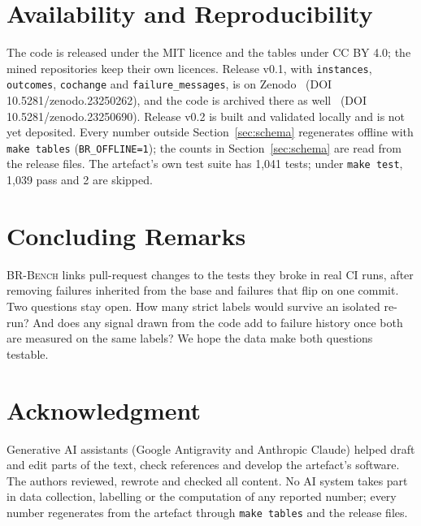 \documentclass[10pt,conference]{IEEEtran}
\begin{document}
\section{Availability and Reproducibility}

The code is released under the MIT licence and the tables under CC BY 4.0; the mined repositories keep their own licences. Release v0.1, with \texttt{instances}, \texttt{outcomes}, \texttt{cochange} and \texttt{failure\_messages}, is on Zenodo~\cite{brbench_data} (DOI 10.5281/zenodo.23250262), and the code is archived there as well~\cite{brbench_code} (DOI 10.5281/zenodo.23250690). Release v0.2 is built and validated locally and is not yet deposited. Every number outside Section~\ref{sec:schema} regenerates offline with \texttt{make tables} (\texttt{BR\_OFFLINE=1}); the counts in Section~\ref{sec:schema} are read from the release files. The artefact's own test suite has 1,041 tests; under \texttt{make test}, 1,039 pass and 2 are skipped.

\section{Concluding Remarks}

\textsc{BR-Bench} links pull-request changes to the tests they broke in real CI runs, after removing failures inherited from the base and failures that flip on one commit. Two questions stay open. How many strict labels would survive an isolated re-run? And does any signal drawn from the code add to failure history once both are measured on the same labels? We hope the data make both questions testable.

\section*{Acknowledgment}
Generative AI assistants (Google Antigravity and Anthropic Claude) helped draft and edit parts of the text, check references and develop the artefact's software. The authors reviewed, rewrote and checked all content. No AI system takes part in data collection, labelling or the computation of any reported number; every number regenerates from the artefact through \texttt{make tables} and the release files.
\end{document}

